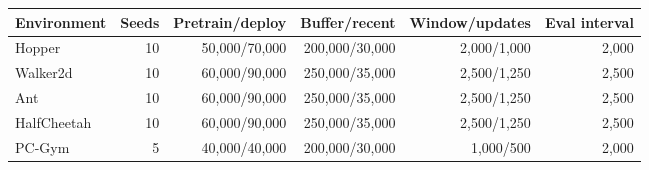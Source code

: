 \begin{tabular}{lrrrrr}
\toprule
Environment & Seeds & Pretrain/deploy & Buffer/recent & Window/updates & Eval interval \\
\midrule
Hopper & 10 & 50,000/70,000 & 200,000/30,000 & 2,000/1,000 & 2,000 \\
Walker2d & 10 & 60,000/90,000 & 250,000/35,000 & 2,500/1,250 & 2,500 \\
Ant & 10 & 60,000/90,000 & 250,000/35,000 & 2,500/1,250 & 2,500 \\
HalfCheetah & 10 & 60,000/90,000 & 250,000/35,000 & 2,500/1,250 & 2,500 \\
PC-Gym & 5 & 40,000/40,000 & 200,000/30,000 & 1,000/500 & 2,000 \\
\bottomrule
\end{tabular}
